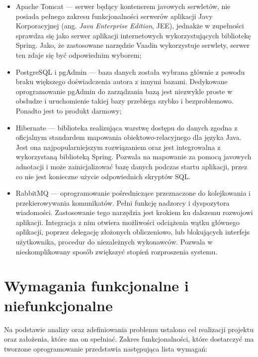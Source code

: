 \documentclass[a4paper]{book}
\newcommand{\obcy}[2]{{\selectlanguage{#1}#2}}
\newcommand{\ang}[1]{\emph{\obcy{british}{#1}}}
\begin{document}
\begin{itemize}
	\item Apache Tomcat \cite{id:ApacheTomcat} --- serwer będący kontenerem javowych serwletów, nie posiada pełnego zakresu funkcjonalności serwerów aplikacji Javy Korporacyjnej (ang. \ang{Java Enterprise Edition}, JEE), jednakże w zupełności sprawdza się jako serwer aplikacji internetowych wykorzystujących bibliotekę Spring. Jako, że zastosowane narzędzie Vaadin wykorzystuje serwlety, serwer ten zdaje się być odpowiednim wyborem;
	\item PostgreSQL \cite{id:PostgreSQL} i pgAdmin \cite{id:pgAdmin} --- baza danych została wybrana głównie z powodu braku większego doświadczenia autora z innymi bazami. Dedykowane oprogramowanie pgAdmin do zarządzania bazą jest niezwykle proste w obsłudze i uruchomienie takiej bazy przebiega szybko i bezproblemowo. Ponadto jest to produkt darmowy;
	\item Hibernate \cite{id:Hibernate} --- biblioteka realizująca warstwę dostępu do danych zgodna z oficjalnym standardem mapowania obiektowo-relacyjnego dla języka Java. Jest ona najpopularniejszym rozwiązaniem oraz jest integrowalna z wykorzystaną biblioteką Spring. Pozwala na mapowanie za pomocą javowych adnotacji i może zainicjalizować bazę danych podczas startu aplikacji, przez co nie jest konieczne użycie odpowiednich skryptów SQL.
	\item RabbitMQ \cite{id:RabbitMQ} --- oprogramowanie pośredniczące przeznaczone do kolejkowania i przekierowywania komunikatów. Pełni funkcję nadzorcy i dyspozytora wiadomości. Zastosowanie tego narzędzia jest krokiem ku dalszemu rozwojowi aplikacji. Integracja z nim otwiera możliwości odciążenia wątku głównego aplikacji, poprzez delegację złożonych obliczeniowo, lub blokujących interfejs użytkownika, procedur do niezależnych wykonawców. Pozwala w nieskomplikowany sposób zwiększyć stopień rozproszenia systemu.
\end{itemize}


\chapter{Wymagania funkcjonalne i niefunkcjonalne}

Na podstawie analizy oraz zdefiniowania problemu ustalono cel realizacji projektu oraz założenia, które ma on spełniać. Zakres funkcjonalności, które dostarczyć ma tworzone oprogramowanie przedstawia następująca lista wymagań:
\end{document}

